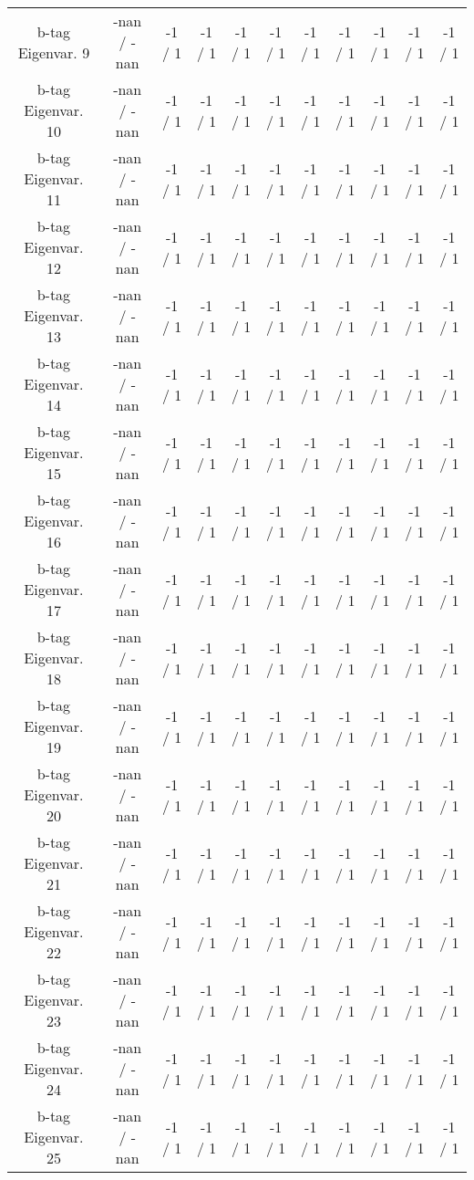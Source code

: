 \begin{table}[htbp]
\begin{center}
\begin{tabular}{|c|c|c|c|c|c|c|c|c|c|c|}
  b-tag Eigenvar. 9 & -nan / -nan & -1 / 1 & -1 / 1 & -1 / 1 & -1 / 1 & -1 / 1 & -1 / 1 & -1 / 1 & -1 / 1 & -1 / 1 \\ 
  b-tag Eigenvar. 10 & -nan / -nan & -1 / 1 & -1 / 1 & -1 / 1 & -1 / 1 & -1 / 1 & -1 / 1 & -1 / 1 & -1 / 1 & -1 / 1 \\ 
  b-tag Eigenvar. 11 & -nan / -nan & -1 / 1 & -1 / 1 & -1 / 1 & -1 / 1 & -1 / 1 & -1 / 1 & -1 / 1 & -1 / 1 & -1 / 1 \\ 
  b-tag Eigenvar. 12 & -nan / -nan & -1 / 1 & -1 / 1 & -1 / 1 & -1 / 1 & -1 / 1 & -1 / 1 & -1 / 1 & -1 / 1 & -1 / 1 \\ 
  b-tag Eigenvar. 13 & -nan / -nan & -1 / 1 & -1 / 1 & -1 / 1 & -1 / 1 & -1 / 1 & -1 / 1 & -1 / 1 & -1 / 1 & -1 / 1 \\ 
  b-tag Eigenvar. 14 & -nan / -nan & -1 / 1 & -1 / 1 & -1 / 1 & -1 / 1 & -1 / 1 & -1 / 1 & -1 / 1 & -1 / 1 & -1 / 1 \\ 
  b-tag Eigenvar. 15 & -nan / -nan & -1 / 1 & -1 / 1 & -1 / 1 & -1 / 1 & -1 / 1 & -1 / 1 & -1 / 1 & -1 / 1 & -1 / 1 \\ 
  b-tag Eigenvar. 16 & -nan / -nan & -1 / 1 & -1 / 1 & -1 / 1 & -1 / 1 & -1 / 1 & -1 / 1 & -1 / 1 & -1 / 1 & -1 / 1 \\ 
  b-tag Eigenvar. 17 & -nan / -nan & -1 / 1 & -1 / 1 & -1 / 1 & -1 / 1 & -1 / 1 & -1 / 1 & -1 / 1 & -1 / 1 & -1 / 1 \\ 
  b-tag Eigenvar. 18 & -nan / -nan & -1 / 1 & -1 / 1 & -1 / 1 & -1 / 1 & -1 / 1 & -1 / 1 & -1 / 1 & -1 / 1 & -1 / 1 \\ 
  b-tag Eigenvar. 19 & -nan / -nan & -1 / 1 & -1 / 1 & -1 / 1 & -1 / 1 & -1 / 1 & -1 / 1 & -1 / 1 & -1 / 1 & -1 / 1 \\ 
  b-tag Eigenvar. 20 & -nan / -nan & -1 / 1 & -1 / 1 & -1 / 1 & -1 / 1 & -1 / 1 & -1 / 1 & -1 / 1 & -1 / 1 & -1 / 1 \\ 
  b-tag Eigenvar. 21 & -nan / -nan & -1 / 1 & -1 / 1 & -1 / 1 & -1 / 1 & -1 / 1 & -1 / 1 & -1 / 1 & -1 / 1 & -1 / 1 \\ 
  b-tag Eigenvar. 22 & -nan / -nan & -1 / 1 & -1 / 1 & -1 / 1 & -1 / 1 & -1 / 1 & -1 / 1 & -1 / 1 & -1 / 1 & -1 / 1 \\ 
  b-tag Eigenvar. 23 & -nan / -nan & -1 / 1 & -1 / 1 & -1 / 1 & -1 / 1 & -1 / 1 & -1 / 1 & -1 / 1 & -1 / 1 & -1 / 1 \\ 
  b-tag Eigenvar. 24 & -nan / -nan & -1 / 1 & -1 / 1 & -1 / 1 & -1 / 1 & -1 / 1 & -1 / 1 & -1 / 1 & -1 / 1 & -1 / 1 \\ 
  b-tag Eigenvar. 25 & -nan / -nan & -1 / 1 & -1 / 1 & -1 / 1 & -1 / 1 & -1 / 1 & -1 / 1 & -1 / 1 & -1 / 1 & -1 / 1 \\ 

\end{tabular}
\end{center}
\end{table}
